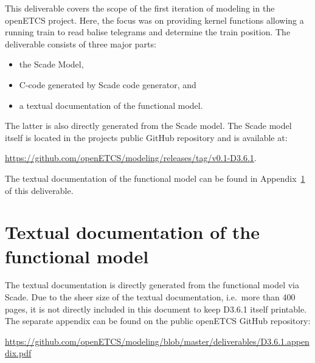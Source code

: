 \documentclass{template/openetcs_report}
\begin{document}
This deliverable covers the scope of the first iteration of modeling in the openETCS project. Here, the focus was on providing kernel functions allowing a running train to read balise telegrams and determine the train position. The deliverable consists of three major parts:
\begin{itemize}
\item the Scade Model, 
\item C-code generated by Scade code generator, and
\item a textual documentation of the functional model.
\end{itemize}
The latter is also directly generated from the Scade model. The Scade model itself is located in the projects public GitHub repository and is available at:

\url{https://github.com/openETCS/modeling/releases/tag/v0.1-D3.6.1}.

The textual documentation of the functional model can be found in Appendix~\ref{a:textual} of this deliverable.

\appendix

\chapter{Textual documentation of the functional model}\label{a:textual}
The textual documentation is directly generated from the functional model via Scade. Due to the sheer size of the textual documentation, i.e.~more than 400 pages, it is not directly included in this document to keep D3.6.1 itself printable. The separate appendix can be found on the public openETCS GitHub repository:

\url{https://github.com/openETCS/modeling/blob/master/deliverables/D3.6.1.appendix.pdf}
\end{document}
